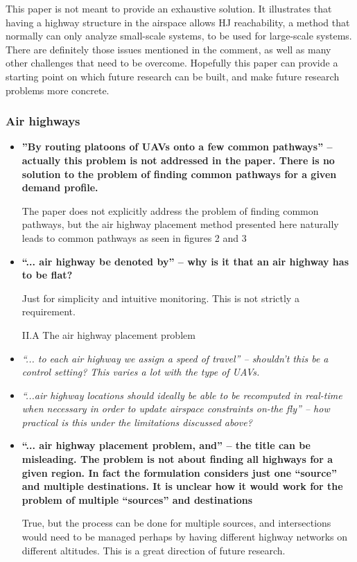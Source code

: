 \documentclass[submit]{aiaa-pretty}
\begin{document}
\begin{itemize}
This paper is not meant to provide an exhaustive solution. It illustrates that having a highway structure in the airspace allows HJ reachability, a method that normally can only analyze small-scale systems, to be used for large-scale systems. There are definitely those issues mentioned in the comment, as well as many other challenges that need to be overcome. Hopefully this paper can provide a starting point on which future research can be built, and make future research problems more concrete.
\end{itemize}

\subsubsection{Air highways}
\begin{itemize}
\item \textbf{''By routing platoons of UAVs onto a few common pathways'' – actually this problem is not addressed in the paper. There is no solution to the problem of finding common pathways for a given demand profile.}

The paper does not explicitly address the problem of finding common pathways, but the air highway placement method presented here naturally leads to common pathways as seen in figures 2 and 3

\item \textbf{``... air highway be denoted by'' – why is it that an air highway has to be flat?}

Just for simplicity and intuitive monitoring. This is not strictly a requirement.

II.A The air highway placement problem
\item \textit{``... to each air highway we assign a speed of travel'' – shouldn’t this be a control setting? This varies a lot with the type of UAVs.}
\item \textit{``...air highway locations should ideally be able to be recomputed in real-time when necessary in order to update airspace constraints on-the fly'' – how practical is this under the limitations discussed above?}
\item \textbf{ ``... air highway placement problem, and'' – the title can be misleading. The problem is not about finding all highways for a given region. In fact the formulation considers just one “source” and multiple destinations. It is unclear how it would work for the problem of multiple ``sources'' and destinations}

True, but the process can be done for multiple sources, and intersections would need to be managed perhaps by having different highway networks on different altitudes. This is a great direction of future research.


\end{itemize}
\end{document}
